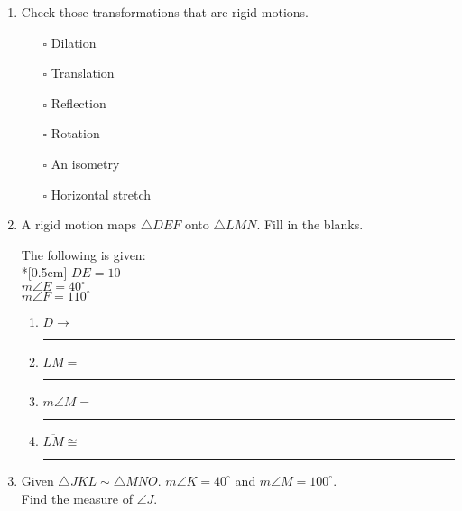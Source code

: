 \documentclass[12pt, twoside]{article}
\begin{document}
\begin{enumerate}
    \item Check those transformations that are rigid motions.
    \begin{itemize}
      \item[$\square$] Dilation
      \item[$\square$] Translation
      \item[$\square$] Reflection
      \item[$\square$] Rotation
      \item[$\square$] An isometry
      \item[$\square$] Horizontal stretch
    \end{itemize}

  \item A rigid motion maps $\triangle DEF$ onto $\triangle LMN$. Fill in the blanks. \vspace{0.5cm}
  \begin{multicols}{2}
    The following is given:\\*[0.5cm]
    $DE=10$ \\
    $m\angle E = 40^\circ$ \\
    $m\angle F = 110^\circ$ \\[0.5cm]
    \columnbreak
    \begin{enumerate}
      \item $D \rightarrow$ \rule{2cm}{0.15mm}
      \item $LM =$ \rule{2cm}{0.15mm}
      \item $m\angle M =$ \rule{2cm}{0.15mm}
      \item $\overline{LM} \cong$ \rule{2cm}{0.15mm}
    \end{enumerate}
  \end{multicols} 

  \item Given $\triangle JKL \sim \triangle MNO$. $m\angle K = 40^\circ$ and $m\angle M = 100^\circ$.\\
    Find the measure of $\angle J$. \vspace{3cm}

\end{enumerate}
\end{document}
